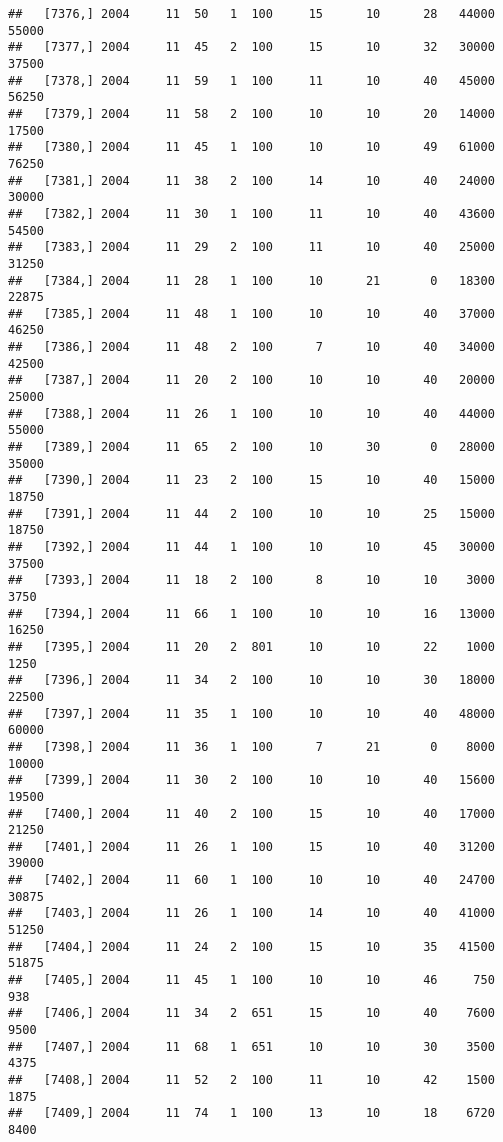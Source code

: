 \documentclass{article}\usepackage[]{graphicx}\usepackage[]{color}
\makeatletter
\newenvironment{kframe}{%
 \def\at@end@of@kframe{}%
 \ifinner\ifhmode%
  \def\at@end@of@kframe{\end{minipage}}%
  \begin{minipage}{\columnwidth}%
 \fi\fi%
 \def\FrameCommand##1{\hskip\@totalleftmargin \hskip-\fboxsep
 \colorbox{shadecolor}{##1}\hskip-\fboxsep
     \hskip-\linewidth \hskip-\@totalleftmargin \hskip\columnwidth}%
 \MakeFramed {\advance\hsize-\width
   \@totalleftmargin\z@ \linewidth\hsize
   \@setminipage}}%
 {\par\unskip\endMakeFramed%
 \at@end@of@kframe}
\newenvironment{knitrout}{}{} %
\makeatother
\begin{document}
\begin{knitrout}
\begin{kframe}
\begin{verbatim}
##   [7376,] 2004     11  50   1  100     15      10      28   44000   55000
##   [7377,] 2004     11  45   2  100     15      10      32   30000   37500
##   [7378,] 2004     11  59   1  100     11      10      40   45000   56250
##   [7379,] 2004     11  58   2  100     10      10      20   14000   17500
##   [7380,] 2004     11  45   1  100     10      10      49   61000   76250
##   [7381,] 2004     11  38   2  100     14      10      40   24000   30000
##   [7382,] 2004     11  30   1  100     11      10      40   43600   54500
##   [7383,] 2004     11  29   2  100     11      10      40   25000   31250
##   [7384,] 2004     11  28   1  100     10      21       0   18300   22875
##   [7385,] 2004     11  48   1  100     10      10      40   37000   46250
##   [7386,] 2004     11  48   2  100      7      10      40   34000   42500
##   [7387,] 2004     11  20   2  100     10      10      40   20000   25000
##   [7388,] 2004     11  26   1  100     10      10      40   44000   55000
##   [7389,] 2004     11  65   2  100     10      30       0   28000   35000
##   [7390,] 2004     11  23   2  100     15      10      40   15000   18750
##   [7391,] 2004     11  44   2  100     10      10      25   15000   18750
##   [7392,] 2004     11  44   1  100     10      10      45   30000   37500
##   [7393,] 2004     11  18   2  100      8      10      10    3000    3750
##   [7394,] 2004     11  66   1  100     10      10      16   13000   16250
##   [7395,] 2004     11  20   2  801     10      10      22    1000    1250
##   [7396,] 2004     11  34   2  100     10      10      30   18000   22500
##   [7397,] 2004     11  35   1  100     10      10      40   48000   60000
##   [7398,] 2004     11  36   1  100      7      21       0    8000   10000
##   [7399,] 2004     11  30   2  100     10      10      40   15600   19500
##   [7400,] 2004     11  40   2  100     15      10      40   17000   21250
##   [7401,] 2004     11  26   1  100     15      10      40   31200   39000
##   [7402,] 2004     11  60   1  100     10      10      40   24700   30875
##   [7403,] 2004     11  26   1  100     14      10      40   41000   51250
##   [7404,] 2004     11  24   2  100     15      10      35   41500   51875
##   [7405,] 2004     11  45   1  100     10      10      46     750     938
##   [7406,] 2004     11  34   2  651     15      10      40    7600    9500
##   [7407,] 2004     11  68   1  651     10      10      30    3500    4375
##   [7408,] 2004     11  52   2  100     11      10      42    1500    1875
##   [7409,] 2004     11  74   1  100     13      10      18    6720    8400

\end{verbatim}
\end{kframe}
\end{knitrout}
\end{document}
